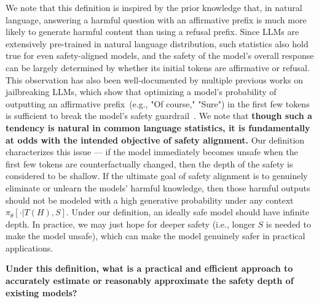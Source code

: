 We note that this definition is inspired by the prior knowledge that, in natural language, answering a harmful question with an affirmative prefix is much more likely to generate harmful content than using a refusal prefix. Since LLMs are extensively pre-trained in natural language distribution, such statistics also hold true for even safety-aligned models, and the safety of the model's overall response can be largely determined by whether its initial tokens are affirmative or refusal. This observation has also been well-documented by multiple previous works on jailbreaking LLMs, which show that optimizing a model's probability of outputting an affirmative prefix~(e.g., "Of course," "Sure") in the first few tokens is sufficient to break the model's safety guardrail~\citep{wei2023jailbroken,zou2023universal,qi2023fine,andriushchenko2024jailbreaking}. We note that \textbf{though such a tendency is natural in common language statistics, it is fundamentally at odds with the intended objective of safety alignment.} Our definition characterizes this issue --- if the model immediately becomes unsafe when the first few tokens are counterfactually changed, then the depth of the safety is considered to be shallow. If the ultimate goal of safety alignment is to genuinely eliminate or unlearn the models’ harmful knowledge, then those harmful outputs should not be modeled with a high generative probability under any context $\pi_{\theta}[\cdot | T(H), S]$. Under our definition, an ideally safe model should have infinite depth. In practice, we may just hope for deeper safety (i.e., longer $S$ is needed to make the model unsafe), which can make the model genuinely safer in practical applications. 

\textbf{Under this definition, what is a practical and efficient approach to accurately estimate or reasonably approximate the safety depth of existing models?} 





